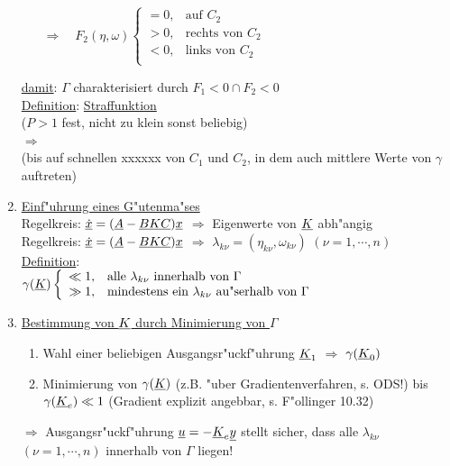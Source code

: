 \documentclass[openany,a4paper,11pt]{book}
\begin{document}
\begin{enumerate}
\begin{itemize}
        $\Rightarrow\quad F_2(\eta,\omega) \left \{%
        \begin{array}{ll}
          =0, & \text{auf } C_2\\
          >0, & \text{rechts von } C_2\\
          <0, & \text{links von } C_2\\
        \end{array} \right.$
    \end{itemize}
    \uline{damit}: $\Gamma$ charakterisiert durch $F_1<0 \cap F_2<0$\\
    \uline{Definition}: \uline{Straffunktion}\\ [3pt]
     \quad ($P>1$ fest, nicht zu klein sonst beliebig)\\
    $\Rightarrow$ \\
    (bis auf schnellen xxxxxx von $C_1$ und $C_2$, in dem auch mittlere Werte von $\gamma$ auftreten)
    \item \uline{Einf"uhrung eines G"utenma"ses}\\
    Regelkreis: $\uline{\dot{x}}=(\uline{A}-\uline{BKC})\uline{x}$ $\Rightarrow$ Eigenwerte von $\uline{K}$ abh"angig\\
    {\color{white}Regelkreis: $\uline{\dot{x}}=(\uline{A}-\uline{BKC})\uline{x}$ $\Rightarrow$} $\lambda_{k\nu}=(\eta_{k\nu},\omega_{k\nu})$ $(\nu=1,\cdots,n)$\\
    \uline{Definition}: \\
    $\gamma(\uline{K}) \left \{%
        \begin{array}{ll}
          \ll 1, & \text{alle } \lambda_{k\nu}\text{ innerhalb von } \Gamma\\
          \gg 1, & \text{mindestens ein } \lambda_{k\nu} \text{ au"serhalb von } \Gamma\\
        \end{array} \right.$
    \item \uline{Bestimmung von $\uline{K}$ durch Minimierung von $\Gamma$}\begin{enumerate}
        \item Wahl einer beliebigen Ausgangsr"uckf"uhrung $\uline{K}_1$ $\Rightarrow$ $\gamma(\uline{K}_0)$
        \item Minimierung von $\gamma(\uline{K})$ (z.B. "uber Gradientenverfahren, s. ODS!) bis $\gamma(\uline{K}_e)\ll1$ (Gradient explizit angebbar, s. F"ollinger 10.32)
    \end{enumerate}
    $\Rightarrow$ Ausgangsr"uckf"uhrung $\uline{u}=-\uline{K}_e\uline{y}$ stellt sicher, dass alle $\lambda_{k\nu}$ $(\nu=1,\cdots,n)$ innerhalb von $\Gamma$ liegen!
\end{enumerate}
\end{document}
